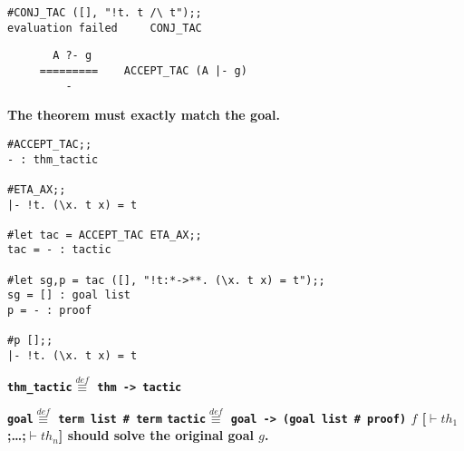 \vskip 4mm
\begin{session}\begin{verbatim}
#CONJ_TAC ([], "!t. t /\ t");;
evaluation failed     CONJ_TAC
\end{verbatim}\end{session}




\vskip6mm
{\Large\begin{verbatim}
       A ?- g
     =========    ACCEPT_TAC (A |- g)
         -
\end{verbatim}}
\bpindent\LARGE\bf
The theorem must exactly match the goal.
\epindent

\vskip 3mm
\begin{session}\begin{verbatim}
#ACCEPT_TAC;;
- : thm_tactic

#ETA_AX;;
|- !t. (\x. t x) = t

#let tac = ACCEPT_TAC ETA_AX;;
tac = - : tactic

#let sg,p = tac ([], "!t:*->**. (\x. t x) = t");;
sg = [] : goal list
p = - : proof

#p [];;
|- !t. (\x. t x) = t
\end{verbatim}\end{session}

\vskip 3mm
\bspindent\Large\bf
\verb!thm_tactic!\quad  $\stackrel{def}{\equiv}$ \quad 
\verb!thm -> tactic!
\espindent



\vskip5mm
\bspindent\Large\bf
\verb!goal!\quad  $\stackrel{def}{\equiv}$ \quad \verb!term list # term!
\espindent
\vskip7mm
\vskip 5mm
\bspindent\Large\bf
\verb!tactic!\quad  $\stackrel{def}{\equiv}$ \quad 
\verb!goal -> (goal list # proof)!
\espindent
\vskip7mm
\vskip3mm
\vskip3mm
\vskip 5mm
\bspindent\Large\bf
\qquad$f$ [$\vdash th_1$;\ldots;$\vdash th_n$] 
\espindent
\vskip5mm
\bspindent\Large\bf
should solve the original goal $g$.
\epindent
\vskip7mm

